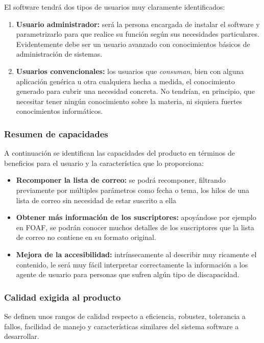 El software tendrá dos tipos de usuarios muy claramente identificados:

\begin{enumerate}
  \item \textbf{Usuario administrador:} será la persona encargada de
	instalar el software y parametrizarlo para que realice su
	función según sus necesidades particulares. Evidentemente debe
	ser un usuario avanzado con conocimientos básicos de administración
	de sistemas.
  \item \textbf{Usuarios convencionales:} los usuarios que \emph{consuman},
	bien con alguna aplicación genérica u otra cualquiera hecha a medida,
	el conocimiento generado para cubrir una necesidad concreta. No
	tendrían, en principio, que necesitar tener ningún conocimiento 
	sobre la materia, ni siquiera fuertes conocimientos informáticos.
\end{enumerate}

\subsubsection{Resumen de capacidades}

A continuación se identifican las capacidades del producto en términos de 
beneficios para el usuario y la característica que lo proporciona:

\begin{itemize}
  \item \textbf{Recomponer la lista de correo:} se podrá recomponer, filtrando 
	previamente por múltiples parámetros como fecha o tema, los hilos de una 
	lista de correo sin necesidad de estar suscrito a ella
  \item \textbf{Obtener más información de los suscriptores:} apoyándose por 
	ejemplo en FOAF, se podrán conocer muchos detalles de los suscriptores 
	que la lista de correo no contiene en su formato original.
  \item \textbf{Mejora de la accesibilidad:} intrínsecamente al describir muy 
	ricamente el contenido, le será muy fácil interpretar correctamente 
	la información a los agente de usuario para personas que sufren algún 
	tipo de discapacidad.
\end{itemize}

\subsubsection{Calidad exigida al producto}

Se definen unos rangos de calidad respecto a eficiencia, robustez, 
tolerancia a fallos, facilidad de manejo y características similares 
del sistema software a desarrollar.

